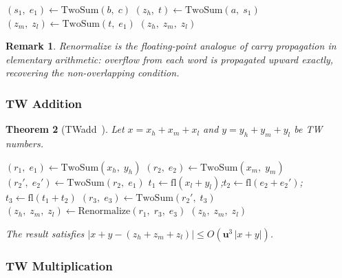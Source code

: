 \documentclass[12pt,a4paper]{article}
\newtheorem{theorem}{Theorem}[section]
\newtheorem{remark}[theorem]{Remark}
\newcommand{\fl}{\mathrm{fl}}
\newcommand{\uu}{\mathbf{u}}
\begin{document}
\begin{algorithm}[H]
\caption{$\mathrm{Renormalize}(a, b, c) \to (z_h,\, z_m,\, z_l)$}
\begin{algorithmic}[1]
\State $(s_1,\; e_1) \leftarrow \mathrm{TwoSum}(b,\; c)$
\State $(z_h,\; t) \leftarrow \mathrm{TwoSum}(a,\; s_1)$
\State $(z_m,\; z_l) \leftarrow \mathrm{TwoSum}(t,\; e_1)$
\State \Return $(z_h,\; z_m,\; z_l)$
\end{algorithmic}
\end{algorithm}

\begin{remark}
Renormalize is the floating-point analogue of carry propagation in
elementary arithmetic: overflow from each word is propagated upward
exactly, recovering the non-overlapping condition.
\end{remark}

\subsubsection{TW Addition}

\begin{theorem}[TWadd~\cite{Fabiano2019}]
Let $x = x_h + x_m + x_l$ and $y = y_h + y_m + y_l$ be TW numbers.

\begin{algorithm}[H]
\caption{$\mathrm{TWadd}(x_h,x_m,x_l,\; y_h,y_m,y_l) \to (z_h,z_m,z_l)$}
\begin{algorithmic}[1]
\State $(r_1,\; e_1) \leftarrow \mathrm{TwoSum}(x_h,\; y_h)$
\State $(r_2,\; e_2) \leftarrow \mathrm{TwoSum}(x_m,\; y_m)$
\State $(r_2',\; e_2') \leftarrow \mathrm{TwoSum}(r_2,\; e_1)$
\State $t_1 \leftarrow \fl(x_l + y_l)$;\quad $t_2 \leftarrow \fl(e_2 + e_2')$;\quad $t_3 \leftarrow \fl(t_1 + t_2)$
\State $(r_3,\; e_3) \leftarrow \mathrm{TwoSum}(r_2',\; t_3)$
\State $(z_h,\; z_m,\; z_l) \leftarrow \mathrm{Renormalize}(r_1,\; r_3,\; e_3)$
\State \Return $(z_h,\; z_m,\; z_l)$
\end{algorithmic}
\end{algorithm}

The result satisfies $|x + y - (z_h + z_m + z_l)| \leq O(\uu^3\,|x+y|)$.
\end{theorem}

\subsubsection{TW Multiplication}
\end{document}
